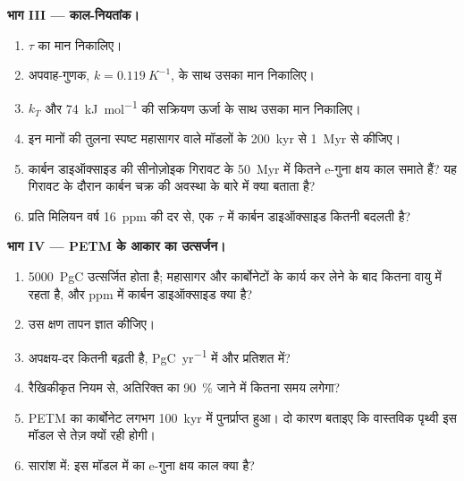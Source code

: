 \begin{problem}
\noindent\textbf{भाग III --- काल-नियतांक।}
\begin{enumerate}[resume]
  \item $\tau$ का मान निकालिए।
  \item अपवाह-गुणक, $k = \qty{0.119}{K^{-1}}$, के साथ उसका मान निकालिए।
  \item $k_T$ और \qty{74}{kJ.mol^{-1}} की सक्रियण ऊर्जा के साथ उसका मान निकालिए।
  \item इन मानों की तुलना स्पष्ट महासागर वाले मॉडलों के \qty{200}{kyr} से \qty{1}{Myr} से कीजिए।
  \item कार्बन डाइऑक्साइड की सीनोज़ोइक गिरावट के \qty{50}{Myr} में कितने e-गुना क्षय काल समाते हैं?
        यह गिरावट के दौरान कार्बन चक्र की अवस्था के बारे में क्या बताता है?
  \item प्रति मिलियन वर्ष \qty{16}{ppm} की दर से, एक $\tau$ में कार्बन डाइऑक्साइड कितनी बदलती है?
\end{enumerate}

\noindent\textbf{भाग IV --- PETM के आकार का उत्सर्जन।}
\begin{enumerate}[resume]
  \item \qty{5000}{PgC} उत्सर्जित होता है; महासागर और कार्बोनेटों के कार्य कर लेने के बाद कितना
        वायु में रहता है, और \unit{ppm} में कार्बन डाइऑक्साइड क्या है?
  \item उस क्षण तापन ज्ञात कीजिए।
  \item अपक्षय-दर कितनी बढ़ती है, \unit{PgC.yr^{-1}} में और प्रतिशत में?
  \item रैखिकीकृत नियम से, अतिरिक्त का \qty{90}{\percent} जाने में कितना समय लगेगा?
  \item PETM का कार्बोनेट लगभग \qty{100}{kyr} में पुनर्प्राप्त हुआ। दो कारण बताइए कि वास्तविक
        पृथ्वी इस मॉडल से तेज़ क्यों रही होगी।
  \item सारांश में: इस मॉडल में  का e-गुना क्षय काल क्या है?
\end{enumerate}
\end{problem}
